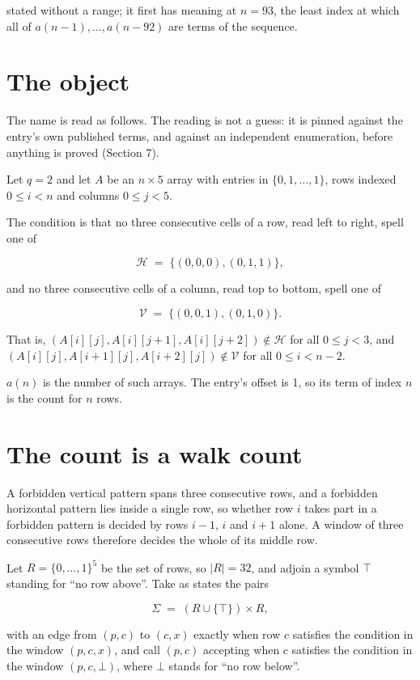 \documentclass[11pt]{article}
\theoremstyle{definition}
\begin{document}
stated without a range; it first has meaning at $n = 93$, the least index at which all of $a(n-1),\dots,a(n-92)$ are terms of the sequence.

\section{The object}

The name is read as follows. The reading is not a guess: it is pinned against the entry's own published terms, and against an independent enumeration, before anything is proved (Section 7).

Let $q = 2$ and let $A$ be an $n \times 5$ array with entries in $\{0,1,\dots,1\}$, rows indexed $0 \le i < n$ and columns $0 \le j < 5$.

The condition is that no three consecutive cells of a row, read left to right, spell one of

\[\mathcal{H} \;=\; \{(0,0,0), (0,1,1)\},\]

and no three consecutive cells of a column, read top to bottom, spell one of

\[\mathcal{V} \;=\; \{(0,0,1), (0,1,0)\}.\]

That is, $(A[i][j],A[i][j{+}1],A[i][j{+}2]) \notin \mathcal{H}$ for all $0 \le j < 3$, and $(A[i][j],A[i{+}1][j],A[i{+}2][j]) \notin \mathcal{V}$ for all $0 \le i < n-2$.

$a(n)$ is the number of such arrays. The entry's offset is 1, so its term of index $n$ is the count for $n$ rows.

\section{The count is a walk count}

A forbidden vertical pattern spans three consecutive rows, and a forbidden horizontal pattern lies inside a single row, so whether row $i$ takes part in a forbidden pattern is decided by rows $i-1$, $i$ and $i+1$ alone. A window of three consecutive rows therefore decides the whole of its middle row.

Let $R = \{0,\dots,1\}^{5}$ be the set of rows, so $|R| = 32$, and adjoin a symbol $\top$ standing for ``no row above''. Take as states the pairs

\[\Sigma \;=\; (R \cup \{\top\}) \times R,\]

with an edge from $(p,c)$ to $(c,x)$ exactly when row $c$ satisfies the condition in the window $(p,c,x)$, and call $(p,c)$ accepting when $c$ satisfies the condition in the window $(p,c,\bot)$, where $\bot$ stands for ``no row below''.
\end{document}
